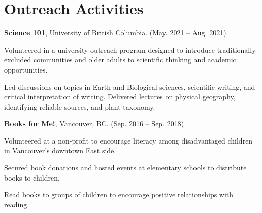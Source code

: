 \documentclass[11pt,letterpaper]{article}
\renewenvironment{itemize}{
	\begin{list}{}{
			\setlength{\leftmargin}{1.5em}
			\setlength{\rightmargin}{0em}  %
			\setlength{\itemsep}{0.25em}
			\setlength{\parskip}{0pt}
			\setlength{\parsep}{0.25em}
		}
	}{
	\end{list}
}
\newenvironment{itemizeit}
{\itemize\let\origitem\item
	\renewcommand{\item}[1][default]
	{\origitem[\tiny $\blacksquare$]}}
{\enditemize}
\renewenvironment{itemize}{
	\begin{list}{}{
			\setlength{\leftmargin}{1.5em}
			\setlength{\itemsep}{0.25em}
			\setlength{\parskip}{0pt}
			\setlength{\parsep}{0.25em}
		}
	}{
	\end{list}
}
\begin{document}
\section*{Outreach Activities}
\begin{itemize}
\item {\bf Science 101}, University of British Columbia. \hfill (May. 2021 -- Aug. 2021)

	\begin{itemizeit} 
		\item Volunteered in a university outreach program designed to introduce traditionally-excluded communities and older adults to scientific thinking and academic opportunities.
		\item Led discussions on topics in Earth and Biological sciences, scientific writing, and critical interpretation of writing. Delivered lectures on physical geography, identifying reliable sources, and plant taxonomy.
	\end{itemizeit}

\item { \bf Books for Me!}, Vancouver, BC. \hfill (Sep. 2016 -- Sep. 2018)

	\begin{itemizeit} %
		\item Volunteered at a non-profit to encourage literacy among disadvantaged children in Vancouver's downtown East side.
		\item Secured book donations and hosted events at elementary schools to distribute books to children.
		\item Read books to groups of children to encourage positive relationships with reading.
	\end{itemizeit}
\end{itemize}
\end{document}
